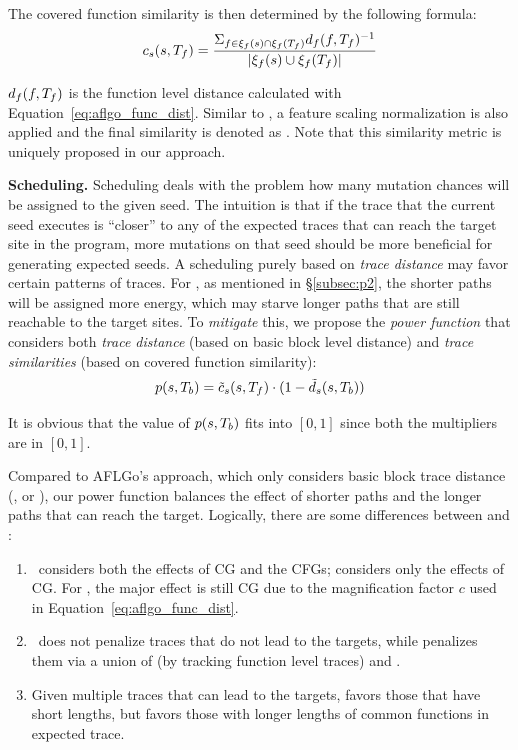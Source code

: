 The covered function similarity is then determined by the following formula:
\begin{equation}
c_s(s, T_f) = \frac{\Sigma_{f\in\xi_f(s)	\cap\xi_f(T_f)}d_f(f,T_f)^{-1}}{|\xi_f(s)\cup\xi_f(T_f)|}
\end{equation}

$d_f(f,T_f)$ is the function level distance calculated with Equation~\ref{eq:aflgo_func_dist}. Similar to \traceDistn, a feature scaling normalization is also applied and the final similarity is denoted as \covDistnN. Note that this similarity metric is uniquely proposed in our approach.

\textbf{Scheduling.}
Scheduling deals with the problem how many mutation chances will be assigned to the given seed. The intuition is that if the trace that the current seed executes is ``closer'' to any of the expected traces that can reach the target site in the program, more mutations on that seed should be more beneficial for generating expected seeds. A scheduling purely based on \emph{trace distance} may favor certain patterns of traces. For \aflgo, as mentioned in \S\ref{subsec:p2}, the shorter paths will be assigned more energy, which may starve longer paths that are still reachable to the target sites. To \emph{mitigate} this, we propose the \emph{power function} that considers both \emph{trace distance} (based on basic block level distance) and \emph{trace similarities} (based on covered function similarity): 
\begin{equation}\label{eq:aflgo_power}
p(s, T_b) = \tilde{c}_{s}(s, T_f)\cdot(1 - \tilde{d}_s(s,T_b))
\end{equation}

It is obvious that the value of $p(s, T_b)$ fits into $[0,1]$ since both the multipliers are in $[0,1]$.

Compared to AFLGo's approach, which only considers basic block trace distance (\traceDistn, or \traceDistnFinal), our power function balances the effect of shorter paths and the longer paths that can reach the target. Logically, there are some differences between {\covDistn} and {\traceDistn}:
\begin{enumerate}[(1)]
    \item \traceDistn~considers both the effects of CG and the CFGs; {\covDistn} considers only the effects of CG. For \traceDistn, the major effect is still CG due to the magnification factor $c$ used in Equation~\ref{eq:aflgo_func_dist}.
    \item \traceDistn~does not penalize traces that do not lead to the targets, while {\covDistn} penalizes them via a union of  (by tracking function level traces) and \fntrace{\tgtfnset}.
    \item Given multiple traces that can lead to the targets, {\traceDistn} favors those that have short lengths, but {\covDistn} favors those with longer lengths of common functions in expected trace.
\end{enumerate}

